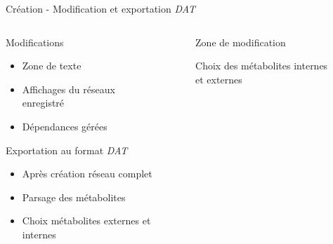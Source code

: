 \documentclass{beamer}
\begin{document}
\begin{frame}{\textcolor{bleu2}{\hspace{1cm}Création - Modification et exportation \emph{DAT}}}
\small
	\begin{columns}
		\begin{column}[l]{4cm}
		\begin{block}{\hspace{0.2cm}Modifications}
				\begin{itemize}
					\item Zone de texte
					\item Affichages du réseaux enregistré
					\item Dépendances gérées
				\end{itemize}
			\end{block}
			\begin{block}{\hspace{0.2cm}Exportation au format \emph{DAT}}
				\begin{itemize}
					\item Après création réseau complet
					\item Parsage des métabolites
					\item Choix métabolites externes et internes
				\end{itemize}
			\end{block}
		\end{column}
		\begin{column}[r]{6cm}
			\begin{figure}[!ht]
				\begin{center}
					\caption{Zone de modification}
  				\end{center}
			\end{figure}
			\begin{figure}[!ht]
				\begin{center}
					\caption{Choix des métabolites internes et externes}
  				\end{center}
			\end{figure}
		\end{column}
	\end{columns}
\end{frame}
\end{document}
